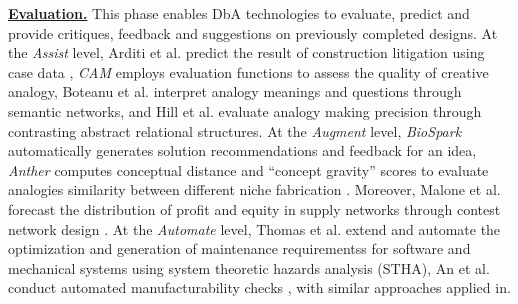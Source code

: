 \textbf{\underline{Evaluation.}} This phase enables DbA technologies to evaluate, predict and provide critiques, feedback and suggestions on previously completed designs. At the \textit{Assist} level, Arditi et al. predict the result of construction litigation using case data \cite{dougan2022predicting}, \textit{CAM} employs evaluation functions to assess the quality of creative analogy\cite{bhavya2023cam}, Boteanu et al. interpret analogy meanings and questions through semantic networks\cite{boteanu2015solving}, and Hill et al. evaluate analogy making precision through contrasting abstract relational structures\cite{hill2019learning}. At the \textit{Augment} level, \textit{BioSpark} automatically generates solution recommendations and feedback for an idea\cite{kang2025biospark}, \textit{Anther} computes conceptual distance and ``concept gravity'' scores to evaluate analogies similarity between different  niche fabrication \cite{emerson2024anther}. Moreover, Malone et al. forecast the distribution of profit and equity in supply networks through contest network design \cite{malone2017putting}. At the \textit{Automate} level, Thomas et al. extend and automate the optimization and generation of maintenance requirementss for software and mechanical systems using system theoretic hazards analysis (STHA)\cite{thomas2013extending}, An et al. conduct automated manufacturability checks\cite{an2020bim} , with similar approaches applied in\cite{coley2019robotic, zhang2020deep, gonzalez2018energy}.

